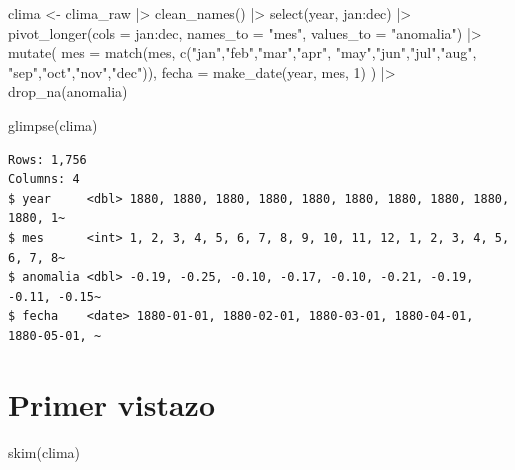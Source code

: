 \documentclass[
  letterpaper,
  DIV=11,
  numbers=noendperiod]{scrreprt}
\newenvironment{Shaded}{\begin{snugshade}}{\end{snugshade}}
\newcommand{\AttributeTok}[1]{\textcolor[rgb]{0.40,0.45,0.13}{#1}}
\newcommand{\DecValTok}[1]{\textcolor[rgb]{0.68,0.00,0.00}{#1}}
\newcommand{\FunctionTok}[1]{\textcolor[rgb]{0.28,0.35,0.67}{#1}}
\newcommand{\NormalTok}[1]{\textcolor[rgb]{0.00,0.23,0.31}{#1}}
\newcommand{\OtherTok}[1]{\textcolor[rgb]{0.00,0.23,0.31}{#1}}
\newcommand{\SpecialCharTok}[1]{\textcolor[rgb]{0.37,0.37,0.37}{#1}}
\newcommand{\StringTok}[1]{\textcolor[rgb]{0.13,0.47,0.30}{#1}}
\begin{document}
\begin{Shaded}
\begin{Highlighting}[]
\NormalTok{clima }\OtherTok{\textless{}{-}}\NormalTok{ clima\_raw }\SpecialCharTok{|\textgreater{}}
  \FunctionTok{clean\_names}\NormalTok{() }\SpecialCharTok{|\textgreater{}}
  \FunctionTok{select}\NormalTok{(year, jan}\SpecialCharTok{:}\NormalTok{dec) }\SpecialCharTok{|\textgreater{}}
  \FunctionTok{pivot\_longer}\NormalTok{(}\AttributeTok{cols =}\NormalTok{ jan}\SpecialCharTok{:}\NormalTok{dec,}
               \AttributeTok{names\_to  =} \StringTok{"mes"}\NormalTok{,}
               \AttributeTok{values\_to =} \StringTok{"anomalia"}\NormalTok{) }\SpecialCharTok{|\textgreater{}}
  \FunctionTok{mutate}\NormalTok{(}
    \AttributeTok{mes   =} \FunctionTok{match}\NormalTok{(mes, }\FunctionTok{c}\NormalTok{(}\StringTok{"jan"}\NormalTok{,}\StringTok{"feb"}\NormalTok{,}\StringTok{"mar"}\NormalTok{,}\StringTok{"apr"}\NormalTok{,}
                         \StringTok{"may"}\NormalTok{,}\StringTok{"jun"}\NormalTok{,}\StringTok{"jul"}\NormalTok{,}\StringTok{"aug"}\NormalTok{,}
                         \StringTok{"sep"}\NormalTok{,}\StringTok{"oct"}\NormalTok{,}\StringTok{"nov"}\NormalTok{,}\StringTok{"dec"}\NormalTok{)),}
    \AttributeTok{fecha =} \FunctionTok{make\_date}\NormalTok{(year, mes, }\DecValTok{1}\NormalTok{)}
\NormalTok{  ) }\SpecialCharTok{|\textgreater{}}
  \FunctionTok{drop\_na}\NormalTok{(anomalia)}

\FunctionTok{glimpse}\NormalTok{(clima)}
\end{Highlighting}
\end{Shaded}

\begin{verbatim}
Rows: 1,756
Columns: 4
$ year     <dbl> 1880, 1880, 1880, 1880, 1880, 1880, 1880, 1880, 1880, 1880, 1~
$ mes      <int> 1, 2, 3, 4, 5, 6, 7, 8, 9, 10, 11, 12, 1, 2, 3, 4, 5, 6, 7, 8~
$ anomalia <dbl> -0.19, -0.25, -0.10, -0.17, -0.10, -0.21, -0.19, -0.11, -0.15~
$ fecha    <date> 1880-01-01, 1880-02-01, 1880-03-01, 1880-04-01, 1880-05-01, ~
\end{verbatim}

\section{Primer vistazo}\label{primer-vistazo}

\begin{Shaded}
\begin{Highlighting}[]
\FunctionTok{skim}\NormalTok{(clima)}
\end{Highlighting}
\end{Shaded}
\end{document}
